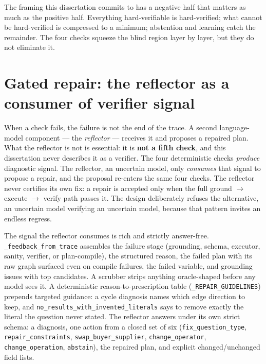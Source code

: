 \documentclass[10pt]{article} %
\begin{document}
The framing this dissertation commits to has a negative half that matters as much as the positive half. Everything hard-verifiable is hard-verified; what cannot be hard-verified is compressed to a minimum; abstention and learning catch the remainder. The four checks squeeze the blind region layer by layer, but they do not eliminate it.

\section{Gated repair: the reflector as a consumer of verifier signal}\label{sec:gated-repair-the-reflector-as-a-consumer}

When a check fails, the failure is not the end of the trace. A second language-model component --- the \emph{reflector} --- receives it and proposes a repaired plan. What the reflector is not is essential: it is \textbf{not a fifth check}, and this dissertation never describes it as a verifier. The four deterministic checks \emph{produce} diagnostic signal. The reflector, an uncertain model, only \emph{consumes} that signal to propose a repair, and the proposal re-enters the same four checks. The reflector never certifies its own fix: a repair is accepted only when the full ground $\rightarrow$ execute $\rightarrow$ verify path passes it. The design deliberately refuses the alternative, an uncertain model verifying an uncertain model, because that pattern invites an endless regress.

The signal the reflector consumes is rich and strictly answer-free. \texttt{\_feedback\_from\_trace} assembles the failure stage (grounding, schema, executor, sanity, verifier, or plan-compile), the structured reason, the failed plan with its raw graph surfaced even on compile failures, the failed variable, and grounding issues with top candidates. A scrubber strips anything oracle-shaped before any model sees it. A deterministic reason-to-prescription table (\texttt{\_REPAIR\_GUIDELINES}) prepends targeted guidance: a cycle diagnosis names which edge direction to keep, and \texttt{no\_results\_with\_invented\_literals} says to remove exactly the literal the question never stated. The reflector answers under its own strict schema: a diagnosis, one action from a closed set of six (\texttt{fix\_question\_type}, \texttt{repair\_constraints}, \texttt{swap\_buyer\_supplier}, \texttt{change\_operator}, \texttt{change\_operation}, \texttt{abstain}), the repaired plan, and explicit changed/unchanged field lists.
\end{document}
